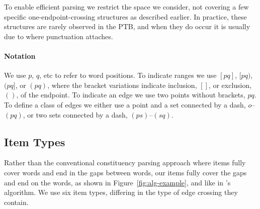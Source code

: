 To enable efficient parsing we restrict the space we consider, not covering a few specific one-endpoint-crossing structures as described earlier.
In practice, these structures are rarely observed in the PTB, and when they do occur it is usually due to where punctuation attaches.

\paragraph{Notation}
We use $p$, $q$, etc to refer to word positions.
To indicate ranges we use $[pq]$, $[pq)$, $(pq]$, or $(pq)$, where the bracket variations indicate inclusion, $[]$, or exclusion, $()$, of the endpoint.
To indicate an edge we use two points without brackets, \myeg $pq$.
To define a class of edges we either use a point and a set connected by a dash, \myeg $o$--$(pq)$, or two sets connected by a dash, \myeg $(ps)$--$(sq)$.

\subsection{Item Types}

Rather than the conventional constituency parsing approach where items fully cover words and end in the gaps between words, our items fully cover the gaps and end on the words, as shown in Figure~\ref{fig:alg-example}, and like in \textcite{eisner-satta-1999}'s algorithm.
We use six item types, differing in the type of edge crossing they contain.  \\

